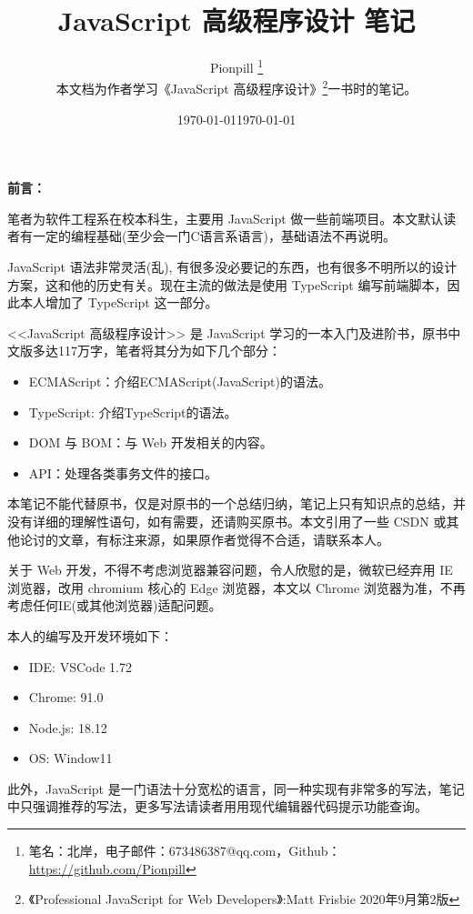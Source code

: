 \documentclass{PionpillNote-book}
\title{JavaScript 高级程序设计 笔记}
\author{
    Pionpill \footnote{笔名：北岸，电子邮件：673486387@qq.com，Github：\url{https://github.com/Pionpill}} \\
    本文档为作者学习《JavaScript 高级程序设计》\footnote{《Professional JavaScript for Web Developers》:Matt Frisbie 2020年9月第2版}一书时的笔记。\\
}
\date{\today}
\begin{document}
\pagestyle{plain}
\maketitle

\noindent\textbf{前言：}

笔者为软件工程系在校本科生，主要用 JavaScript 做一些前端项目。本文默认读者有一定的编程基础(至少会一门C语言系语言)，基础语法不再说明。

JavaScript 语法非常灵活(乱), 有很多没必要记的东西，也有很多不明所以的设计方案，这和他的历史有关。现在主流的做法是使用 TypeScript 编写前端脚本，因此本人增加了 TypeScript 这一部分。

<<JavaScript 高级程序设计>> 是 JavaScript 学习的一本入门及进阶书，原书中文版多达117万字，笔者将其分为如下几个部分：
\begin{itemize}
    \item ECMAScript：介绍ECMAScript(JavaScript)的语法。
    \item TypeScript: 介绍TypeScript的语法。 
    \item DOM 与 BOM：与 Web 开发相关的内容。
    \item API：处理各类事务文件的接口。
\end{itemize}

本笔记不能代替原书，仅是对原书的一个总结归纳，笔记上只有知识点的总结，并没有详细的理解性语句，如有需要，还请购买原书。本文引用了一些 CSDN 或其他论讨的文章，有标注来源，如果原作者觉得不合适，请联系本人。

关于 Web 开发，不得不考虑浏览器兼容问题，令人欣慰的是，微软已经弃用 IE 浏览器，改用 chromium 核心的 Edge 浏览器，本文以 Chrome 浏览器为准，不再考虑任何IE(或其他浏览器)适配问题。

本人的编写及开发环境如下：
\begin{itemize}
    \item IDE: VSCode 1.72 
    \item Chrome: 91.0
    \item Node.js: 18.12
    \item OS: Window11
\end{itemize}

此外，JavaScript 是一门语法十分宽松的语言，同一种实现有非常多的写法，笔记中只强调推荐的写法，更多写法请读者用用现代编辑器代码提示功能查询。

\date{\today}
\newpage

\tableofcontents

\newpage

\setcounter{page}{1} 
\pagestyle{fancy}
\end{document}
